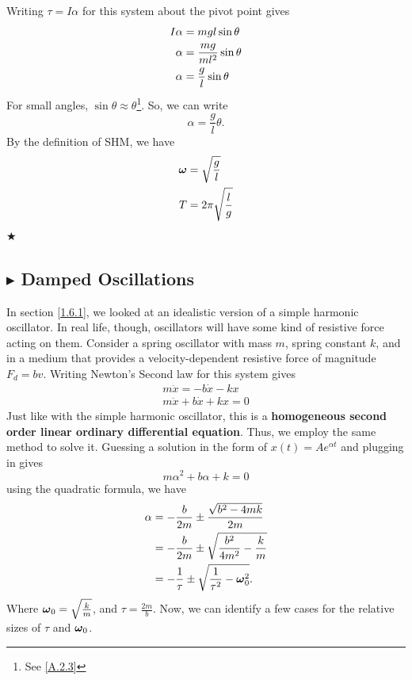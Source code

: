 \noindent Writing $\tau = I\alpha$ for this system about the pivot point gives
\begin{align}
    I\alpha &= mgl\sin\theta \nonumber \\
    \alpha &= \frac{mg}{ml^2}\sin\theta \nonumber \\
    \alpha &= \frac{g}{l}\sin\theta
\end{align}
\noindent For small angles, $\sin\theta \approx \theta$\footnote{See \ref{A.2.3}}. So, we can write 
\begin{equation*}
    \alpha = \frac{g}{l}\theta.
\end{equation*}
\noindent By the definition of SHM, we have
\begin{align}
    \boldsymbol{\omega} &= \sqrt{\frac{g}{l}} \nonumber \\
    T &= 2\pi\sqrt{\frac{l}{g}}
\end{align}
$\bigstar$

%
%
\subsection{\color{Orchid} $\blacktriangleright$ \color{black} Damped Oscillations} \label{1.6.4}
In section \ref{1.6.1}, we looked at an idealistic version of a simple harmonic oscillator. In real life, though, oscillators will have some kind of resistive force acting on them. Consider a spring oscillator with mass $m$, spring constant $k$, and in a medium that provides a velocity-dependent resistive force of magnitude $F_d = bv$. Writing Newton's Second law for this system gives
\begin{gather*}
    m\ddot{x} = -b\dot{x} -kx \\
    m\ddot{x} + b\dot{x} + kx = 0
\end{gather*}
\noindent Just like with the simple harmonic oscillator, this is a \textbf{homogeneous second order linear ordinary differential equation}. Thus, we employ the same method to solve it. Guessing a solution in the form of $x(t) = Ae^{\alpha t}$ and plugging in gives
\begin{equation}
    m\alpha^2 + b\alpha + k = 0
\end{equation}
\noindent using the quadratic formula, we have
\begin{align}
    \alpha &= -\frac{b}{2m} \pm \frac{\sqrt{b^2-4mk}}{2m} \nonumber \\
    &= -\frac{b}{2m} \pm \sqrt{\frac{b^2}{4m^2} - \frac{k}{m}} \nonumber \\
    &= -\frac{1}{\tau} \pm \sqrt{\frac{1}{\tau^2} - \boldsymbol{\omega}_0^2}.
\end{align}
\noindent Where $\boldsymbol{\omega}_0 = \sqrt{\frac{k}{m}}$, and $\tau = \frac{2m}{b}$. Now, we can identify a few cases for the relative sizes of $\tau$ and $\boldsymbol{\omega}_0$. 

